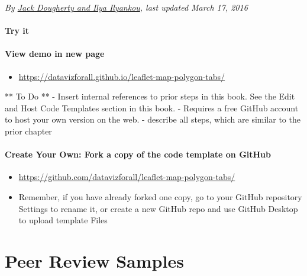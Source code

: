 \documentclass[
  english,
]{book}
\providecommand{\tightlist}{%
  \setlength{\itemsep}{0pt}\setlength{\parskip}{0pt}}
\begin{document}
\emph{By \href{authors}{Jack Dougherty and Ilya Ilyankou}, last updated March 17, 2016}

\hypertarget{try-it-13}{%
\subsubsection*{Try it}\label{try-it-13}}

\hypertarget{view-demo-in-new-page-2}{%
\subsubsection*{View demo in new page}\label{view-demo-in-new-page-2}}

\begin{itemize}
\tightlist
\item
  \url{https://datavizforall.github.io/leaflet-map-polygon-tabs/}
\end{itemize}

** To Do **
- Insert internal references to prior steps in this book. See the Edit and Host Code Templates section in this book.
- Requires a free GitHub account to host your own version on the web.
- describe all steps, which are similar to the prior chapter

\hypertarget{create-your-own-fork-a-copy-of-the-code-template-on-github-2}{%
\subsubsection*{Create Your Own: Fork a copy of the code template on GitHub}\label{create-your-own-fork-a-copy-of-the-code-template-on-github-2}}

\begin{itemize}
\tightlist
\item
  \url{https://github.com/datavizforall/leaflet-map-polygon-tabs/}
\item
  Remember, if you have already forked one copy, go to your GitHub repository Settings to rename it, or create a new GitHub repo and use GitHub Desktop to upload template Files
\end{itemize}

\hypertarget{peer}{%
\chapter{Peer Review Samples}\label{peer}}
\end{document}
